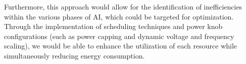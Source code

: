 Furthermore, this approach would allow for the identification of inefficiencies within the various phases of AI, which could be targeted for optimization. Through the implementation of scheduling techniques and power knob configurations (such as power capping and dynamic voltage and frequency scaling), we would be able to enhance the utilization of each resource while simultaneously reducing energy consumption. 
